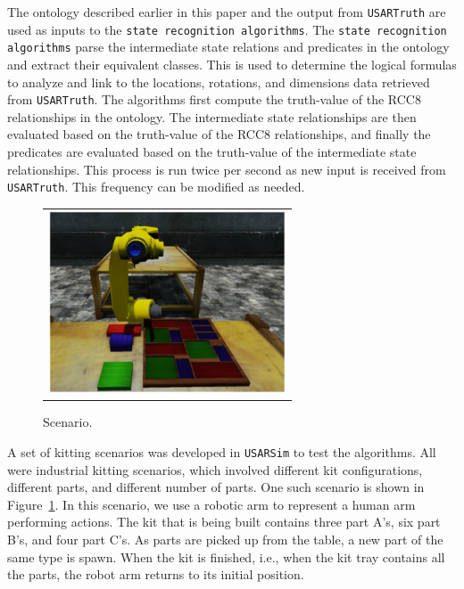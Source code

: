 \documentclass[preprint,12pt]{elsarticle}
\begin{document}
The ontology described earlier in this paper and the output from \texttt{USARTruth} are used as inputs to the \texttt{state recognition algorithms}. The \texttt{state recognition algorithms} parse the intermediate state relations and predicates in the ontology and extract their equivalent classes. This is used to determine the logical formulas to analyze and link to the locations, rotations, and dimensions data retrieved from \texttt{USARTruth}. The algorithms first compute the truth-value of the RCC8 relationships in the ontology. The intermediate state relationships are then evaluated based on the truth-value of the RCC8 relationships, and finally the predicates are evaluated based on the truth-value of the intermediate state relationships. This process is run twice per second as new input is received from \texttt{USARTruth}. This frequency can be modified as needed.

\begin{figure}[t!h!]
\begin{center}
\begin{tabular}{c}
\includegraphics[width=7cm]{simulation.pdf}
\end{tabular}
\end{center}
\caption{Scenario.}
\label{fig:scenario}
\end{figure}

A set of kitting scenarios was developed in \texttt{USARSim} to test the algorithms. All were industrial kitting scenarios, which involved different kit configurations, different parts, and different number of parts. One such scenario is shown in Figure~\ref{fig:scenario}. In this scenario, we use a robotic arm to represent a human arm performing actions. The kit that is being built contains three part A's, six part B's, and four part C's. As parts are picked up from the table, a new part of the same type is spawn. When the kit is finished, i.e., when the kit tray contains all the parts, the robot arm returns to its initial position.
\end{document}
